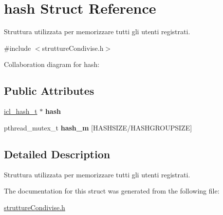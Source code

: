 \hypertarget{structhash}{}\section{hash Struct Reference}
\label{structhash}


Struttura utilizzata per memorizzare tutti gli utenti registrati.  




{\ttfamily \#include $<$strutture\+Condivise.\+h$>$}



Collaboration diagram for hash\+:
\subsection*{Public Attributes}
\begin{DoxyCompactItemize}
\item 
\mbox{\label{structhash_aa847fe6fb93773455eba971b63214bbc}} 
\hyperlink{structicl__hash__s}{icl\+\_\+hash\+\_\+t} $\ast$ {\bfseries hash}
\item 
\mbox{\label{structhash_ac43fc83022feacc61d88294dfe565be6}} 
pthread\+\_\+mutex\+\_\+t {\bfseries hash\+\_\+m} \mbox{[}H\+A\+S\+H\+S\+I\+ZE/H\+A\+S\+H\+G\+R\+O\+U\+P\+S\+I\+ZE\mbox{]}
\end{DoxyCompactItemize}


\subsection{Detailed Description}
Struttura utilizzata per memorizzare tutti gli utenti registrati. 

The documentation for this struct was generated from the following file\+:\begin{DoxyCompactItemize}
\item 
\hyperlink{struttureCondivise_8h}{strutture\+Condivise.\+h}\end{DoxyCompactItemize}
